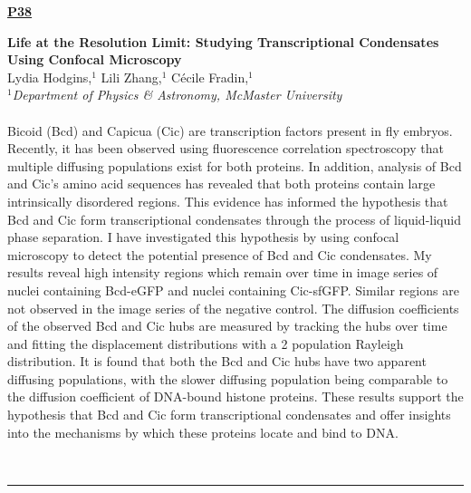 \documentclass[titlepage,oneside,openany,10pt]{book}
\newenvironment{posterabs}[4] %
        {
	\begin{flushright}
                \underline{\textbf{#4}}
        \end{flushright}
        \textbf{#1}\\%
        #2\\%
        \textit{#3}\\\\%
        }
        {
        \\
        \noindent\rule{15cm}{0.5pt}%
        }
\begin{document}
\begin{posterabs}
    {Life at the Resolution Limit: Studying Transcriptional Condensates Using Confocal Microscopy}
    {Lydia Hodgins,$^{1}$ Lili Zhang,$^{1}$ C\'{e}cile Fradin,$^{1}$}
    {
    $^1$Department of Physics \& Astronomy, McMaster University
    }
    {P38}
    Bicoid (Bcd) and Capicua (Cic) are transcription factors present in fly embryos. Recently, it has been observed using fluorescence correlation spectroscopy that multiple diffusing populations exist for both proteins. In addition, analysis of Bcd and Cic's amino acid sequences has revealed that both proteins contain large intrinsically disordered regions. This evidence has informed the hypothesis that Bcd and Cic form transcriptional condensates through the process of liquid-liquid phase separation. I have investigated this hypothesis by using confocal microscopy to detect the potential presence of Bcd and Cic condensates. My results reveal high intensity regions which remain over time in image series of nuclei containing Bcd-eGFP and nuclei containing Cic-sfGFP. Similar regions are not observed in the image series of the negative control. The diffusion coefficients of the observed Bcd and Cic hubs are measured by tracking the hubs over time and fitting the displacement distributions with a 2 population Rayleigh distribution. It is found that both the Bcd and Cic hubs have two apparent diffusing populations, with the slower diffusing population being comparable to the diffusion coefficient of DNA-bound histone proteins. These results support the hypothesis that Bcd and Cic form transcriptional condensates and offer insights into the mechanisms by which these proteins locate and bind to DNA.
    \label{HodginsL}
\end{posterabs}

\vspace{1cm}
\end{document}
